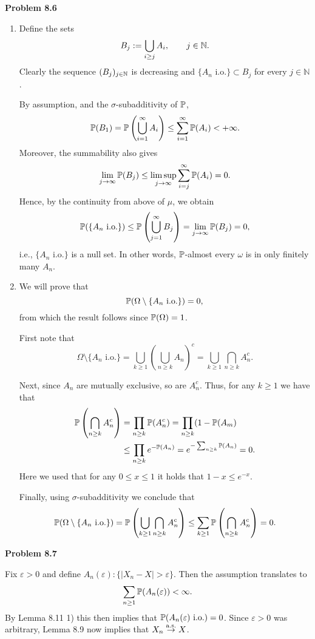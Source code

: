 \documentclass{lecturenotes}
\begin{document}
\textbf{Problem 8.6}
\begin{enumerate}[label={(\alph*)}]
\item Define the sets
\[
	B_j := \bigcup_{i \ge j} A_i,\qquad j\in\mathbb N.
\]
Clearly the sequence $(B_j)_{j\in\mathbb N}$ is decreasing and $\{A_n \text{ i.o.}\}\subset B_j$ for every $j \in \mathbb{N}$. 

By assumption, and the $\sigma$-subadditivity of $\mathbb P$,
\[
\mathbb P(B_1) = \mathbb P\left(\bigcup_{i=1}^\infty A_i \right) \leq \sum_{i=1}^\infty \mathbb P(A_i) < +\infty.
\]
Moreover, the summability also gives
\[
	\lim_{j\to\infty}\mathbb P(B_j) \leq \limsup_{j\to\infty}\sum_{i=j}^\infty \mathbb P(A_i) = 0.
\]
Hence, by the continuity from above of $\mu$, we obtain
\[
	\mathbb P(\{A_n \text{ i.o.}\}) \le \mathbb P\left(\bigcup_{j=1}^\infty B_j\right) = \lim_{j\to \infty} \mathbb P(B_j) = 0,
\]
i.e., $\{A_n \text{ i.o.}\}$ is a null set. In other words, $\mathbb P$-almost every $\omega$ is in only finitely many $A_n$.
\item We will prove that 
\[
	\mathbb P(\Omega \setminus \{A_n \text{ i.o.}\}) = 0,
\]
from which the result follows since $\mathbb P(\Omega) = 1$.

First note that
\[
	\Omega \setminus \{A_n \text{ i.o.}\} = \bigcup_{k \ge 1} \left(\bigcup_{n \ge k} A_n\right)^c
	= \bigcup_{k \ge 1} \bigcap_{n \ge k} A_n^c.
\]

Next, since $A_n$ are mutually exclusive, so are $A_n^c$. Thus, for any $k \ge 1$ we have that
\begin{align*}
	\mathbb P\left(\bigcap_{n \ge k} A_n^c\right) &= \prod_{n \ge k} \mathbb P(A_n^c) = \prod_{n \ge k} (1-\mathbb P(A_m)\\
	&\le \prod_{n \ge k} e^{-\mathbb P(A_n)} = e^{-\sum_{n \ge k} \mathbb P(A_n)} = 0.
\end{align*}
Here we used that for any $0 \le x \le 1$ it holds that $1-x \le e^{-x}$.

Finally, using $\sigma$-subadditivity we conclude that
\[
	\mathbb P(\Omega \setminus \{A_n \text{ i.o.}\}) = \mathbb P\left(\bigcup_{k \ge 1} \bigcap_{n \ge k} A_n^c\right)
	\le \sum_{k \ge 1} \mathbb P\left(\bigcap_{n \ge k} A_n^c\right) = 0.
\]
\end{enumerate}

\bigskip

\textbf{Problem 8.7}

Fix $\varepsilon > 0$ and define $A_n(\varepsilon) :\{|X_n - X| > \varepsilon\}$. Then the assumption translates to
\[
	\sum_{n \ge 1} \mathbb P(A_n(\varepsilon)) < \infty.
\]
By Lemma 8.11 1) this then implies that $\mathbb P(A_n(\varepsilon) \text{ i.o.}) = 0$. Since $\varepsilon > 0$ was arbitrary, Lemma 8.9 now implies that $X_n \stackrel{\mathrm{a.s.}}{\rightarrow} X$.
\end{document}
